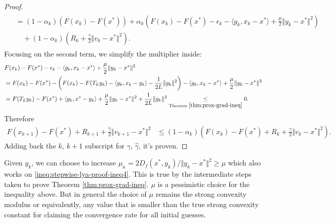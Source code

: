 \documentclass[12pt]{article}
\begin{document}
\begin{proof}
\begin{align}
\begin{split}
                &= (1 - \alpha_k)(F(x_k) - F(x^*))
                + \alpha_k\left(
                    F(x_k) - F(x^*) - \epsilon_k - \langle g_k, x_k - x^*\rangle + \frac{\mu}{2}\Vert y_k - x^*\Vert^2
                \right)
                \\ &\quad 
                    + 
                    (1 - \alpha_k)\left(
                        R_k + \frac{\gamma}{2}\Vert v_k - x^*\Vert^2
                    \right).     
            \end{split}
        \end{align}
        Focusing on the second term, we simplify the multiplier inside: 
        {\small
        \begin{align}\label{ineq:stepwise-lya-proof-ineq4}
        \begin{split}
            & F(x_k) - F(x^*) - \epsilon_k - \langle g_k, x_k - x^*\rangle + \frac{\mu}{2}\Vert y_k - x^*\Vert^2
            \\
            &= 
            F(x_k) - F(x^*) - \left(
                F(x_k) - F(T_L y_k) - \langle g_k, x_k - y_k\rangle - \frac{1}{2L}\Vert g_k\Vert^2
            \right)- \langle g_k, x_k - x^*\rangle + \frac{\mu}{2}\Vert y_k - x^*\Vert^2
            \\
            &= F(T_L y_k) - F(x^*) + \langle g_k, x^* - y_k\rangle + \frac{\mu}{2}\Vert y_k - x^*\Vert^2
            + \frac{1}{2L}\Vert g_k\Vert^2 \underset{\text{Theorem }\ref{thm:prox-grad-ineq}}{\le} 0.     
        \end{split}
        \end{align}
        }
        Therefore
        {\small
        \begin{align*}
            F(x_{k + 1}) - F(x^*) + R_{k + 1} + 
            \frac{\hat \gamma}{2}\Vert v_{k + 1} - x^*\Vert^2
            &\le 
            (1 - \alpha_k)\left(
                F(x_k) - F(x^*) + R_k + \frac{\gamma}{2}\Vert v_k - x^*\Vert^2
            \right). 
        \end{align*}
        }
        Adding back the $k$, $k + 1$ subscript for $\gamma$, $\hat \gamma$, it's proven. 
    \end{proof}
    \begin{remark}
        Given $y_k$, we can choose to increase $\mu_\kappa = 2D_f(x^*, y_k)/\Vert y_k - x^*\Vert^2 \ge \mu$ which also works on \eqref{ineq:stepwise-lya-proof-ineq4}.
        This is true by the intermediate steps taken to prove Theorem \ref{thm:prox-grad-ineq}. 
        $\mu$ is a pessimistic choice for the inequality above. 
        But in general the choice of $\mu$ remains the strong convexity modulus or equivalently, any value that is smaller than the true strong convexity constant for claiming the convergence rate for all initial guesses. 
    \end{remark}
\end{document}
